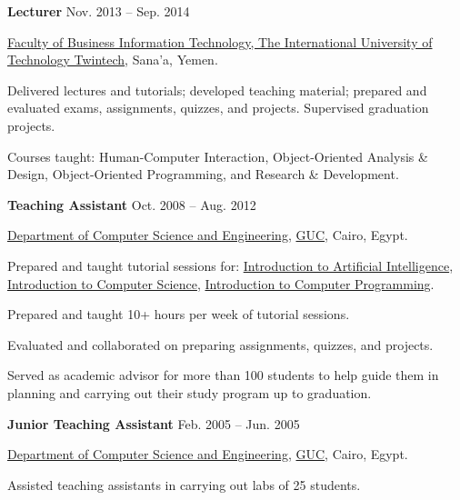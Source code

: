 \documentclass[10pt]{article}
\begin{document}
\textbf{Lecturer} \hfill{Nov. 2013 -- Sep. 2014}
\begin{outerlist}
    \item[] \href{http://iutt.edu.ye/}{Faculty of Business Information Technology, The International University of Technology Twintech}, Sana'a, Yemen.
    \begin{innerlist}
        \item Delivered lectures and tutorials; developed teaching material; prepared and evaluated exams, assignments, quizzes, and projects. Supervised graduation projects.
        \item Courses taught: Human-Computer Interaction, Object-Oriented Analysis \& Design, Object-Oriented Programming, and Research \& Development.\\
    \end{innerlist}
\end{outerlist}


\textbf{Teaching Assistant} \hfill{Oct. 2008 -- Aug. 2012}
\begin{outerlist}
    \item[] \href{http://met.guc.edu.eg/}{Department of Computer Science and Engineering},
            \href{http://guc.edu.eg/}{GUC}, Cairo, Egypt.
    \begin{innerlist}
        \item Prepared and taught tutorial sessions for: \href{http://met.guc.edu.eg/Courses/CourseEdition.aspx?crsEdId=278}{Introduction to Artificial Intelligence}, \href{http://met.guc.edu.eg/Courses/CourseEdition.aspx?crsEdId=271}{Introduction to Computer Science}, \href{http://met.guc.edu.eg/Courses/CourseEdition.aspx?crsEdId=308}{Introduction to Computer Programming}.
       \item Prepared and taught 10+ hours per week of tutorial sessions.
       \item Evaluated and collaborated on preparing assignments, quizzes, and projects.
       \item Served as academic advisor for more than 100 students to help guide them in planning  and carrying out their study program up to graduation.\\
    \end{innerlist}
\end{outerlist}


\textbf{Junior Teaching Assistant} \hfill {Feb. 2005 -- Jun. 2005}
\begin{outerlist}
    \item[] \href{http://met.guc.edu.eg/}{Department of Computer Science and Engineering},
            \href{http://guc.edu.eg/}{GUC}, Cairo, Egypt.
    \begin{innerlist}
        \item Assisted teaching assistants in carrying out labs of 25 students.
    \end{innerlist}
\end{outerlist}
\end{document}
